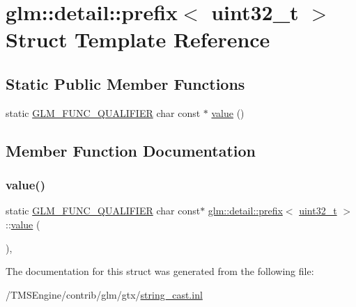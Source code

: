 \hypertarget{structglm_1_1detail_1_1prefix_3_01uint32__t_01_4}{}\section{glm\+:\+:detail\+:\+:prefix$<$ uint32\+\_\+t $>$ Struct Template Reference}
\label{structglm_1_1detail_1_1prefix_3_01uint32__t_01_4}
\subsection*{Static Public Member Functions}
\begin{DoxyCompactItemize}
\item 
static \hyperlink{setup_8hpp_a33fdea6f91c5f834105f7415e2a64407}{G\+L\+M\+\_\+\+F\+U\+N\+C\+\_\+\+Q\+U\+A\+L\+I\+F\+I\+ER} char const  $\ast$ \hyperlink{structglm_1_1detail_1_1prefix_3_01uint32__t_01_4_a8a36d8e3a869d300408dde031429352e}{value} ()
\end{DoxyCompactItemize}


\subsection{Member Function Documentation}
\mbox{\label{structglm_1_1detail_1_1prefix_3_01uint32__t_01_4_a8a36d8e3a869d300408dde031429352e}} 
\subsubsection{\texorpdfstring{value()}{value()}}
{\footnotesize\ttfamily static \hyperlink{setup_8hpp_a33fdea6f91c5f834105f7415e2a64407}{G\+L\+M\+\_\+\+F\+U\+N\+C\+\_\+\+Q\+U\+A\+L\+I\+F\+I\+ER} char const$\ast$ \hyperlink{structglm_1_1detail_1_1prefix}{glm\+::detail\+::prefix}$<$ \hyperlink{group__gtc__type__precision_ga822ca53a9ad412504532838906276a99}{uint32\+\_\+t} $>$\+::\hyperlink{_s_d_l__opengl__glext_8h_a8ad81492d410ff2ac11f754f4042150f}{value} (\begin{DoxyParamCaption}{ }\end{DoxyParamCaption})\hspace{0.3cm}{\ttfamily [inline]}, {\ttfamily [static]}}



The documentation for this struct was generated from the following file\+:\begin{DoxyCompactItemize}
\item 
/\+T\+M\+S\+Engine/contrib/glm/gtx/\hyperlink{string__cast_8inl}{string\+\_\+cast.\+inl}\end{DoxyCompactItemize}
